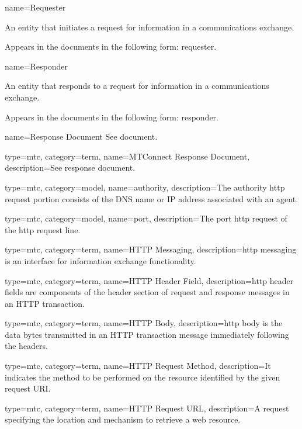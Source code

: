 {
  name={Requester}
}
{
	An entity that initiates a \gls{request} for information in a communications exchange.

	Appears in the documents in the following form: \gls{requester}.
}


{
  name={Responder}
}
{
	An entity that responds to a \gls{request} for information in a communications exchange.

	Appears in the documents in the following form: \gls{responder}.
}


{
  name={Response Document}
}
{
	See \gls{document}.
}

{
  type=mtc,
  category=term,
  name={MTConnect Response Document},
  description={See \gls{response document}.}
}

{
  type=mtc,
  category=model,
  name={authority},
  description={The \gls{authority http request} portion consists of the DNS name or IP address associated with an \gls{agent}.}
}

{
  type=mtc,
  category=model,
  name={port},
  description={The \gls{port http request} of the \gls{http request line}.}
}

{
  type=mtc,
  category=term,
  name={HTTP Messaging},
  description={\gls{http messaging} is an interface for information exchange functionality.}
}

{
  type=mtc,
  category=term,
  name={HTTP Header Field},
  description={\glspl{http header field} are components of the header section of request and response messages in an HTTP transaction.}
}

{
  type=mtc,
  category=term,
  name={HTTP Body},
  description={\gls{http body} is the data bytes transmitted in an HTTP transaction message immediately following the headers.}
}

{
  type=mtc,
  category=term,
  name={HTTP Request Method},
  description={It indicates the method to be performed on the resource identified by the given request URI.}
}

{
  type=mtc,
  category=term,
  name={HTTP Request URL},
  description={A request specifying the location and mechanism to retrieve a web resource.}
}

